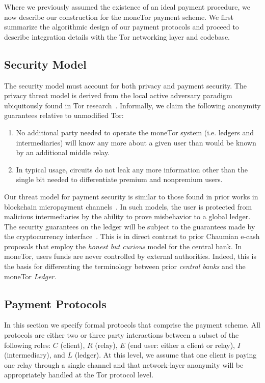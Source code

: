 Where we previously assumed the existence of an ideal payment procedure, we now
describe our construction for the moneTor payment scheme. We first summarize the
algorithmic design of our payment protocols and proceed to describe integration
details with the Tor networking layer and codebase.

\subsection{Security Model}

The security model must account for both privacy and payment security. The
privacy threat model is derived from the local active adversary paradigm
ubiquitously found in Tor research~\cite{dingledine2004tor}. Informally, we
claim the following anonymity guarantees relative to unmodified Tor:

\begin{enumerate}
\item No additional party needed to operate the moneTor system (i.e. ledgers
  and intermediaries) will know any more about a given user than would be known
  by an additional middle relay.
\item In typical usage, circuits do not leak any more information other than the
  single bit needed to differentiate premium and nonpremium users.
\end{enumerate}

Our threat model for payment security is similar to those found in prior works
in blockchain micropayment channels~\cite{poon2016bitcoin}. In such models, the
user is protected from malicious intermediaries by the ability to prove
misbehavior to a global ledger. The security guarantees on the ledger will be
subject to the guarantees made by the cryptocurrency
interface~\cite{back2014enabling, poon2017plasma}. This is in direct contrast to
prior Chaumian e-cash proposals that employ the \emph{honest but curious} model
for the central bank. In moneTor, users funds are never controlled by external
authorities. Indeed, this is the basis for differenting the terminology between
prior \emph{central banks} and the moneTor \emph{Ledger}.

\subsection{Payment Protocols}

In this section we specify formal protocols that comprise the payment
scheme. All protocols are either two or three party interactions between a
subset of the following roles: $C$ (client), $R$ (relay), $E$ (end user: either
a client or relay), $I$ (intermediary), and $L$ (ledger). At this level, we
assume that one client is paying one relay through a single channel and that
network-layer anonymity will be appropriately handled at the Tor protocol level.
